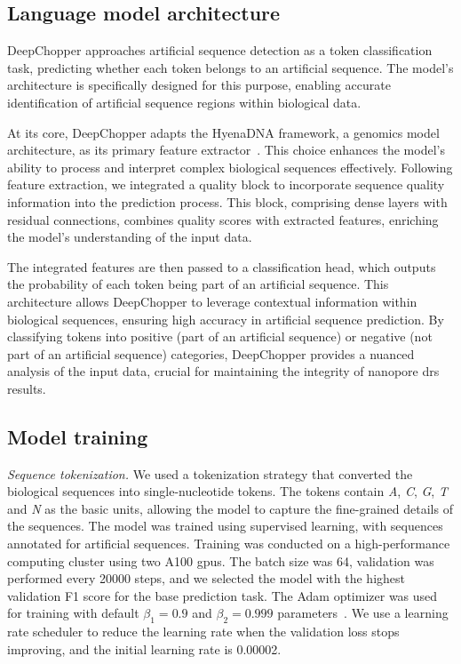 \documentclass[pdflatex, sn-mathphys-num, lineno]{sn-jnl}%
\theoremstyle{thmstyleone}%
\theoremstyle{thmstyletwo}%
\theoremstyle{thmstylethree}%
\begin{document}
\subsection{Language model architecture}\label{ssec:lm}

DeepChopper approaches artificial sequence detection as a token classification task, predicting whether each token belongs to an artificial sequence.
The model's architecture is specifically designed for this purpose, enabling accurate identification of artificial sequence regions within biological data.

At its core, DeepChopper adapts the HyenaDNA framework, a genomics model architecture, as its primary feature extractor~\cite{nguyen2024hyenadna}.
This choice enhances the model's ability to process and interpret complex biological sequences effectively.
Following feature extraction, we integrated a quality block to incorporate sequence quality information into the prediction process.
This block, comprising dense layers with residual connections, combines quality scores with extracted features, enriching the model's understanding of the input data.

The integrated features are then passed to a classification head, which outputs the probability of each token being part of an artificial sequence.
This architecture allows DeepChopper to leverage contextual information within biological sequences, ensuring high accuracy in artificial sequence prediction.
By classifying tokens into positive (part of an artificial sequence) or negative (not part of an artificial sequence) categories, DeepChopper provides a nuanced analysis of the input data, crucial for maintaining the integrity of nanopore \gls{drs}  results.


\subsection{Model training}\label{ssec:training}

\textit{Sequence tokenization.} We used a tokenization strategy that converted the biological sequences into single-nucleotide tokens.
The tokens contain \emph{A}, \emph{C}, \emph{G}, \emph{T} and \emph{N} as the basic units, allowing the model to capture the fine-grained details of the sequences.
The model was trained using supervised learning, with sequences annotated for artificial sequences.
Training was conducted on a high-performance computing cluster using two A100 \glspl{gpu}.
The batch size was \num{64}, validation was performed every \num{20000} steps, and we selected the model with the highest validation F1 score for the base prediction task.
The Adam optimizer was used for training with default \( \beta_{1} = 0.9 \) and \( \beta_{2} = 0.999 \) parameters~\cite{kingma2014adam}.
We use a learning rate scheduler to reduce the learning rate when the validation loss stops improving, and the initial learning rate is \num{0.00002}.
\end{document}

